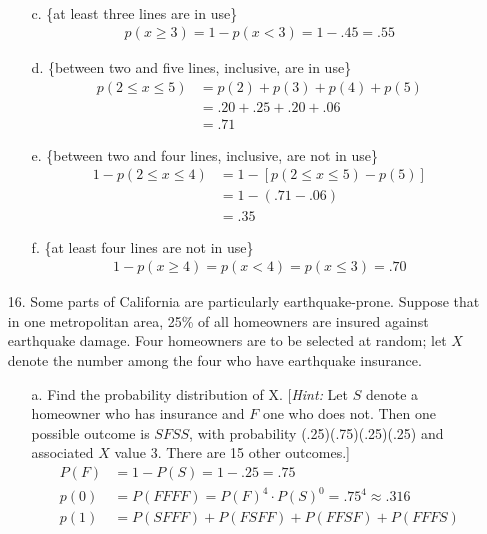 \documentclass[letterpaper,12pt]{article}
\begin{document}
\begin{enumerate}
\begin{enumerate}
\begin{align*}
        \end{align*}
      \item[c.]
        \{at least three lines are in use\}
        \begin{align*}
          p(x \ge 3) = 1 - p(x < 3) = 1 - .45 = .55
        \end{align*}
      \item[d.]
        \{between two and five lines, inclusive, are in use\}
        \begin{align*}
          p(2 \le x \le 5) &= p(2) + p(3) + p(4) + p(5) \\
          &= .20 + .25 + .20 + .06 \\
          &= .71
        \end{align*}
      \item[e.]
        \{between two and four lines, inclusive, are not in use\}
        \begin{align*}
          1 - p(2 \le x \le 4) &= 1 - [p(2 \le x \le 5) - p(5)] \\
          &= 1 - (.71 - .06) \\
          &= .35
        \end{align*}
      \item[f.]
        \{at least four lines are not in use\}
        \begin{align*}
          1 - p(x \ge 4) = p(x < 4) = p(x \le 3) = .70
        \end{align*}
    \end{enumerate}
  \item[16.]
    Some parts of California are particularly earthquake-prone. Suppose that in one metropolitan area, 25\% of all homeowners are insured against earthquake damage. Four homeowners are to be selected at random; let $X$ denote the number among the four who have earthquake insurance.
    \begin{enumerate}
      \item[a.]
        Find the probability distribution of X. [\textit{Hint:} Let $S$ denote a homeowner who has insurance and $F$ one who does not. Then one possible outcome is $SFSS$, with probability (.25)(.75)(.25)(.25) and associated $X$ value 3. There are 15 other outcomes.]
        \begin{align*}
          P(F) &= 1 - P(S) = 1 - .25 = .75 \\
          p(0) &= P(FFFF) = P(F)^4 \cdot P(S)^0 = .75^4 \approx .316 \\
          p(1) &= P(SFFF) + P(FSFF) + P(FFSF) + P(FFFS) \\

\end{align*}
\end{enumerate}
\end{enumerate}
\end{document}
